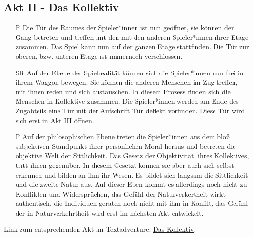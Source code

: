 \documentclass[12pt, a4paper, openany]{report}
\begin{document}
\subsection{Akt II - Das Kollektiv}
\begin{itemize}
\item[R] Die Tür des Raumes der Spieler*innen ist nun geöffnet, sie können den Gang betreten und treffen mit den mit den anderen Spieler*innen ihrer Etage zusammen.
Das Spiel kann nun auf der ganzen Etage stattfinden. 
Die Tür zur oberen, bzw. unteren Etage ist immernoch verschlossen.
\item[SR] Auf der Ebene der Spielrealität können sich die Spieler*innen nun frei in ihrem Waggon bewegen. 
Sie können die anderen Menschen im Zug treffen, mit ihnen reden und sich austauschen. 
In diesem Prozess finden sich die Menschen in Kollektive zusammen.
Die Spieler*innen werden am Ende des Zugabteils eine Tür mit der Aufschrift \glqq Tür deffekt\grqq{} vorfinden.
Diese Tür wird sich erst in Akt III öffnen.
\item[P] Auf der philosophischen Ebene treten die Spieler*innen aus dem bloß subjektiven Standpunkt ihrer persönlichen Moral heraus und betreten die objektive Welt der Sittlichkeit.
Das Gesetz der Objektivität, ihres Kollektives, tritt ihnen gegenüber.
In diesem Gesetzt können sie aber auch sich selbst erkennen und bilden an ihm ihr Wesen. 
Es bildet sich langsam die Sittlichkeit und die zweite Natur aus.
Auf dieser Eben kommt es allerdings noch nicht zu Konflikten und Widersprüchen, das Gefühl der Naturverkertheit wirkt authentisch, die Individuen geraten noch nicht mit ihm in Konfilt, das Gefühl der in Naturverkehrtheit wird erst im nächsten Akt entwickelt.
\end{itemize}
Link zum entsprechenden Akt im Textadventure: \hyperref[das-kollektiv]{Das Kollektiv}.
\end{document}
